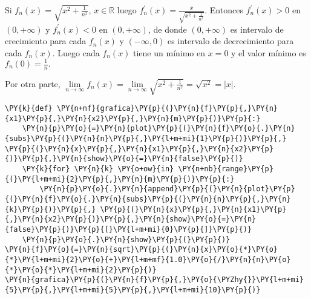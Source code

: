 \begin{ejemplo}{}
Si $f_n(x)=\sqrt{x^2+\frac{1}{n^2}}$, $x \in \mathbb{R}$ luego 
$f_n^{'}(x)=\frac{x}{\sqrt{x^2+\frac{1}{n^2}}}$. 
Entonces $f_n^{'}(x)>0$ en $(0,+\infty)$ y $f_n^{'}(x)<0$ en $(0,+\infty)$, de donde  $(0,+\infty)$ es intervalo de
crecimiento para cada $f_n(x)$ y $(-\infty,0)$ es intervalo de decrecimiento para cada $f_n(x)$.
Luego cada $f_n(x)$ tiene un mínimo en $x=0$ y el valor mínimo es $f_n(0)=\frac{1}{n}.$

Por otra parte, $\lim\limits_{n \to \infty} f_n(x)=\lim\limits_{n \to \infty} \sqrt{x^2+\frac{1}{n^2}}=\sqrt{x^2}=|x|$.
\end{ejemplo}

 \begin{tcolorbox}[breakable, size=fbox, boxrule=1pt, pad at break*=1mm,colback=cellbackground, colframe=cellborder]
\begin{Verbatim}[commandchars=\\\{\}]
\PY{k}{def} \PY{n+nf}{grafica}\PY{p}{(}\PY{n}{f}\PY{p}{,}\PY{n}{x1}\PY{p}{,}\PY{n}{x2}\PY{p}{,}\PY{n}{m}\PY{p}{)}\PY{p}{:}
    \PY{n}{p}\PY{o}{=}\PY{n}{plot}\PY{p}{(}\PY{n}{f}\PY{o}{.}\PY{n}{subs}\PY{p}{(}\PY{n}{n}\PY{p}{,}\PY{l+m+mi}{1}\PY{p}{)}\PY{p}{,} \PY{p}{(}\PY{n}{x}\PY{p}{,}\PY{n}{x1}\PY{p}{,}\PY{n}{x2}\PY{p}{)}\PY{p}{,}\PY{n}{show}\PY{o}{=}\PY{n}{false}\PY{p}{)}
    \PY{k}{for} \PY{n}{k} \PY{o+ow}{in} \PY{n+nb}{range}\PY{p}{(}\PY{l+m+mi}{2}\PY{p}{,}\PY{n}{m}\PY{p}{)}\PY{p}{:}
        \PY{n}{p}\PY{o}{.}\PY{n}{append}\PY{p}{(}\PY{n}{plot}\PY{p}{(}\PY{n}{f}\PY{o}{.}\PY{n}{subs}\PY{p}{(}\PY{n}{n}\PY{p}{,}\PY{n}{k}\PY{p}{)}\PY{p}{,} \PY{p}{(}\PY{n}{x}\PY{p}{,}\PY{n}{x1}\PY{p}{,}\PY{n}{x2}\PY{p}{)}\PY{p}{,}\PY{n}{show}\PY{o}{=}\PY{n}{false}\PY{p}{)}\PY{p}{[}\PY{l+m+mi}{0}\PY{p}{]}\PY{p}{)}
    \PY{n}{p}\PY{o}{.}\PY{n}{show}\PY{p}{(}\PY{p}{)}
\PY{n}{f}\PY{o}{=}\PY{n}{sqrt}\PY{p}{(}\PY{n}{x}\PY{o}{*}\PY{o}{*}\PY{l+m+mi}{2}\PY{o}{+}\PY{l+m+mf}{1.0}\PY{o}{/}\PY{n}{n}\PY{o}{*}\PY{o}{*}\PY{l+m+mi}{2}\PY{p}{)}
\PY{n}{grafica}\PY{p}{(}\PY{n}{f}\PY{p}{,}\PY{o}{\PYZhy{}}\PY{l+m+mi}{5}\PY{p}{,}\PY{l+m+mi}{5}\PY{p}{,}\PY{l+m+mi}{10}\PY{p}{)}
\end{Verbatim}
\end{tcolorbox}

    \begin{center}
    \end{center}
    { \hspace*{\fill} \\}

